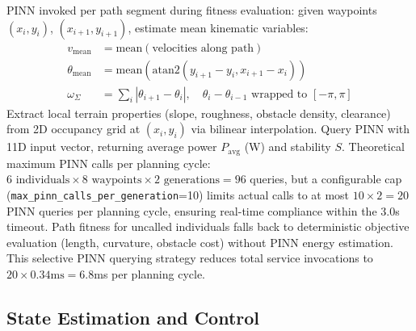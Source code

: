 \documentclass[pdflatex,sn-nature]{sn-jnl}%
\begin{document}
PINN invoked per path segment during fitness evaluation: given waypoints $(x_i, y_i)$, $(x_{i+1}, y_{i+1})$, estimate mean kinematic variables:
\begin{align}
v_{\text{mean}} &= \text{mean}(\text{velocities along path}) \label{eq:velocity_estimate} \\
\theta_{\text{mean}} &= \text{mean}(\text{atan2}(y_{i+1} - y_i, x_{i+1} - x_i)) \label{eq:heading_estimate} \\
\omega_{\Sigma} &= \sum_i |\theta_{i+1} - \theta_i|, \quad \theta_i - \theta_{i-1} \text{ wrapped to } [-\pi,\pi] \label{eq:angular_velocity_estimate}
\end{align}
Extract local terrain properties (slope, roughness, obstacle density, clearance) from 2D occupancy grid at $(x_i, y_i)$ via bilinear interpolation. Query PINN with 11D input vector, returning average power $P_{\text{avg}}$ (W) and stability $S$. Theoretical maximum PINN calls per planning cycle: $6 \text{ individuals} \times 8 \text{ waypoints} \times 2 \text{ generations} = 96$ queries, but a configurable cap (\texttt{max\_pinn\_calls\_per\_generation}=10) limits actual calls to at most $10 \times 2 = 20$ PINN queries per planning cycle, ensuring real-time compliance within the 3.0s timeout. Path fitness for uncalled individuals falls back to deterministic objective evaluation (length, curvature, obstacle cost) without PINN energy estimation. This selective PINN querying strategy reduces total service invocations to $20 \times 0.34\text{ms} = 6.8$ms per planning cycle.

\subsection{State Estimation and Control}
\end{document}
